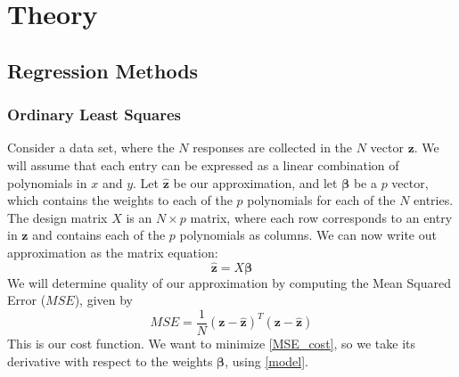 \documentclass[reprint,english,notitlepage]{revtex4-1}  %
\newcommand{\vect}[1]{\boldsymbol{#1}}
\begin{document}
\section{Theory}

\subsection{Regression Methods}

\subsubsection{Ordinary Least Squares}
Consider a data set, where the $N$ responses are collected in the $N$ vector $\vect{z}$. We will assume that each entry can be expressed as a linear combination of polynomials in $x$ and $y$. Let $\hat{\vect{z}}$ be our approximation, and let $\vect{\beta}$ be a $p$ vector, which contains the weights to each of the $p$ polynomials for each of the $N$ entries. The design matrix $X$ is an $N \times p$ matrix, where each row corresponds to an entry in $\vect{z}$ and contains each of the $p$ polynomials as columns. We can now write out approximation as the matrix equation:
\begin{equation} \label{model}
	\hat{\vect{z}} = X\vect{\beta}
\end{equation}
We will determine quality of our approximation by computing the Mean Squared Error ($MSE$), given by
\begin{equation} \label{MSE_cost}
	MSE = \frac{1}{N}\left(\vect{z} - \hat{\vect{z}} \right)^T \left(\vect{z} - \hat{\vect{z}} \right)
\end{equation}
This is our cost function. We want to minimize \ref{MSE_cost}, so we take its derivative with respect to the weights $\vect{\beta}$, using \ref{model}.
\end{document}
